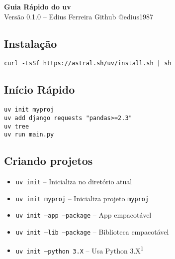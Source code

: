 \documentclass[a4paper,9pt]{article}
\begin{document}
\begin{center}
    {\Large\bfseries Guia Rápido do uv} \\[0.2em]
    {\footnotesize Versão 0.1.0 -- Edius Ferreira}
    {\footnotesize Github @edius1987}
\date{Outubro 2025}

\end{center}

\vspace{-0.4em}

\begin{multicols}{2}

\subsection*{Instalação }
\begin{tcolorbox}[colback=gray!10, colframe=gray!50, boxrule=0.5pt, arc=2pt, left=2pt, right=2pt, top=2pt, bottom=2pt]
\texttt{\footnotesize curl -LsSf https://astral.sh/uv/install.sh | sh}
\end{tcolorbox}

\subsection*{Início Rápido}
\begin{tcolorbox}[colback=blue!5, colframe=blue!30, boxrule=0.5pt, arc=2pt, left=2pt, right=2pt, top=2pt, bottom=2pt]
{\footnotesize
\texttt{uv init myproj} \\
\texttt{uv add django requests "pandas>=2.3"} \\
\texttt{uv tree} \\
\texttt{uv run main.py}
}
\end{tcolorbox}

\subsection*{Criando projetos}
\begin{itemize}[leftmargin=0.3cm]
    \item \texttt{uv init} -- Inicializa no diretório atual
    \item \texttt{uv init myproj} -- Inicializa projeto \texttt{myproj}
    \item \texttt{uv init --app --package} -- App empacotável
    \item \texttt{uv init --lib --package} -- Biblioteca empacotável
    \item \texttt{uv init --python 3.X} -- Usa Python 3.X\textsuperscript{1}
\end{itemize}


\end{multicols}
\end{document}
